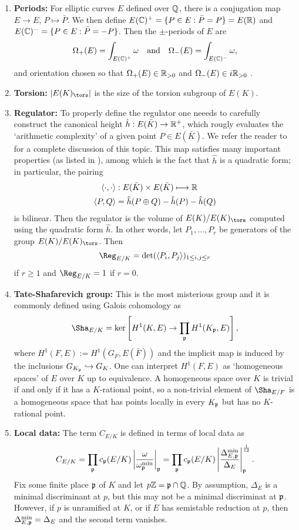 \begin{enumerate}
    \item \textbf{Periods: } For elliptic curves $E$ defined over $\mathbb{Q}$, there is a conjugation map $E\to E$, $P\mapsto\bar{P}$. We then define $E(\mathbb{C})^+=\{P\in E:\bar{P}=P\}=E(\mathbb{R})$ and $E(\mathbb{C})^-=\{P\in E:\bar{P}=-P\}$. Then the $\pm$-periods of $E$ are 
    $$\Omega_+(E)=\int_{E(\mathbb{C})^+}\omega \quad\text{and}\quad\Omega_-(E)=\int_{E(\mathbb{C})^-}\omega,$$
    and orientation chosen so that $\Omega_+(E)\in\mathbb{R}_{>0}$ and $\Omega_-(E)\in i\mathbb{R}_{>0}$ .
    \item \textbf{Torsion:} $|E(K)_{\tors}|$ is the size of the torsion subgroup of $E(K)$.
    \item \textbf{Regulator:} To properly define the regulator one neeeds to carefully construct the canonical height $\hat{h}:E(\bar{K})\rightarrow\mathbb{R}^+$, which rougly evaluates the `arithmetic complexity' of a given point $P\in E(\bar{K})$. We refer the reader to \cite[Chapter VIII: \S4, \S5, \S6 and \S9]{S1} for a complete discussion of this topic. This map satisfies many important properties (as listed in \cite[Chapter VIII, Theorem 9.3]{S1}), among which is the fact that $\hat{h}$ is a quadratic form; in particular, the pairing
    \begin{align*}
        \langle\cdot,\cdot\rangle&:E(\bar{K})\times E(\bar{K})\longmapsto\mathbb{R}\\
        \langle P,Q\rangle&=\hat{h}(P\oplus Q)-\hat{h}(P)-\hat{h}(Q)
    \end{align*}
    is bilinear. Then the regulator is the volume of $E(K)/E(K)_{\tors}$ computed using the quadratic form $\hat{h}$. In other words, let $P_1,\ldots,P_r$ be generators of the group $E(K)/E(K)_{\tors}$. Then $$\Reg_{E/K}=\det(\langle P_i,P_j\rangle)_{1\leq i,j\leq r}$$
    if $r\geq1$ and $\Reg_{E/K}=1$ if $r=0$.
    \item \textbf{Tate-Shafarevich group:} This is the most misterious group and it is commonly defined using Galois cohomology as
    $$\Sha_{E/K}=\ker\left[H^1(K,E)\rightarrow\prod_{\pp}H^1(K_\pp,E)\right],$$
    where $H^1(F,E):=H^1(G_F,E(\bar{F}))$ and the implicit map is induced by the inclusions $G_{K_{\mathfrak{p}}}\hookrightarrow G_K$. One can interpret $H^1(F,E)$ as `homogeneous spaces' of $E$ over $K$ up to equivalence. A homogeneous space over $K$ is trivial if and only if it has a $K$-rational point, so a non-trivial element of $\Sha_{E/F}$ is a homogeneous space that has points locally in every $K_{\mathfrak{p}}$ but has no $K$-rational point.
    \item \textbf{Local data:} The term $C_{E/K}$ is defined in terms of local data as 
    $$C_{E/K}=\prod_{\mathfrak{p}}c_{\mathfrak{p}}(E/K)\left|\frac{\omega}{\omega_{\mathfrak{p}}^{\min}}\right|_{\mathfrak{p}}=\prod_{\mathfrak{p}}c_{\mathfrak{p}}(E/K)\left|\frac{\Delta_{E,\mathfrak{p}}^{\min}}{\Delta_E}\right|_{\mathfrak{p}}^{\frac{1}{12}}.$$
    Fix some finite place $\mathfrak{p}$ of $K$ and let $p\mathbb{Z}=\mathfrak{p}\cap\mathbb{Q}$. By assumption, $\Delta_E$ is a minimal discriminant at $p$, but this may not be a minimal discriminat at $\mathfrak{p}$. However, if $p$ is unramified at $K$, or if $E$ has semistable reduction at $p$, then $\Delta_{E,\mathfrak{p}}^{\min}=\Delta_E$ and the second term vanishes.


\end{enumerate}
